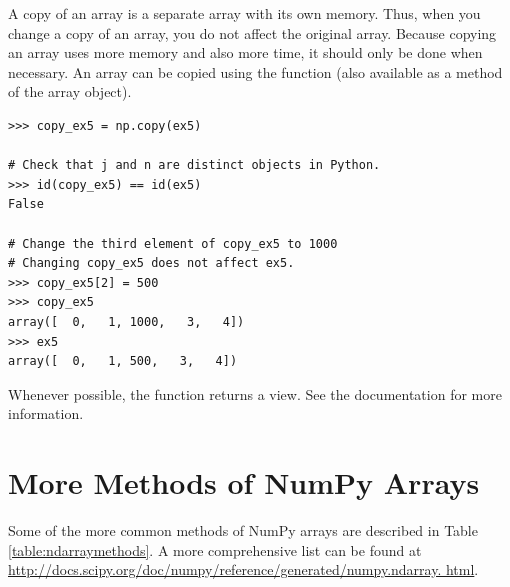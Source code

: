 A copy of an array is a separate array with its own memory. 
Thus, when you change a copy of an array, you do not affect the original array. 
Because copying an array uses more memory and also more time, it should only be done when necessary. 
An array can be copied using the  function (also available as a method of 
the array object). 

\begin{lstlisting}
>>> copy_ex5 = np.copy(ex5) 

# Check that j and n are distinct objects in Python.
>>> id(copy_ex5) == id(ex5) 
False

# Change the third element of copy_ex5 to 1000
# Changing copy_ex5 does not affect ex5.
>>> copy_ex5[2] = 500 
>>> copy_ex5
array([  0,   1, 1000,   3,   4])
>>> ex5
array([  0,   1, 500,   3,   4])
\end{lstlisting} 

Whenever possible, the function  returns a view. 
See the documentation for more information. 



\section*{More Methods of NumPy Arrays} 
Some of the more common methods of NumPy arrays are described in Table \ref{table:ndarraymethods}. 
A more comprehensive list can be found at
\url{http://docs.scipy.org/doc/numpy/reference/generated/numpy.ndarray.
html}.


